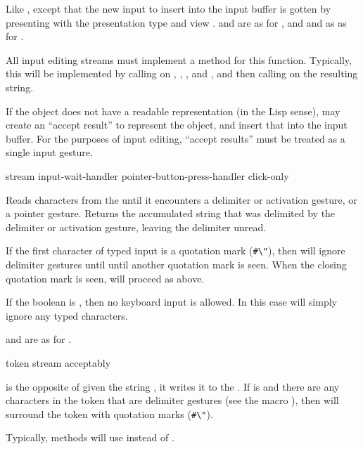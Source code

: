 Like , except that the new input to insert into the input
buffer is gotten by presenting  with the presentation type
 and view .  and  are as for
, and  and  as as
for .

All input editing streams must implement a method for this function.  Typically,
this will be implemented by calling  on ,
, , and , and then calling
 on the resulting string.

If the object does not have a readable representation (in the Lisp sense),
 may create an ``accept result'' to represent the
object, and insert that into the input buffer.  For the purposes of input
editing, ``accept results'' must be treated as a single input gesture.


 {stream \key input-wait-handler pointer-button-press-handler click-only}

Reads characters from the   until it
encounters a delimiter or activation gesture, or a pointer gesture.  Returns the
accumulated string that was delimited by the delimiter or activation gesture,
leaving the delimiter unread.

If the first character of typed input is a quotation mark (\verb+#\"+), then
 will ignore delimiter gestures until until another quotation
mark is seen.  When the closing quotation mark is seen,  will
proceed as above.

If the boolean  is , then no keyboard input is
allowed.  In this case  will simply ignore any typed characters.

 and  are as for
.

 {token stream \key acceptably}

 is the opposite of  given the string
, it writes it to the  .  If
 is  and there are any characters in the token that
are delimiter gestures (see the macro ), then
 will surround the token with quotation marks (\verb+#\"+).

Typically,  methods will use  instead of
.



